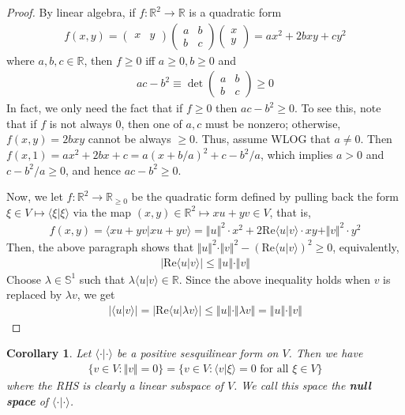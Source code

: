 \documentclass[12pt,b5paper,notitlepage]{article}
\theoremstyle{definition}
\theoremstyle{plain}
\newtheorem{co}[df]{Corollary}
\newcommand{\bk}[1]{\langle {#1}\rangle}
\newcommand{\Rbb}{\mathbb R}
\newcommand{\Sbb}{{\mathbb S}}
\newcommand{\Real}{\mathrm{Re}}
\numberwithin{equation}{section}
\begin{document}
\begin{proof}
By linear algebra, if $f:\Rbb^2\rightarrow\Rbb$ is a quadratic form
\begin{align*}
f(x,y)=\begin{pmatrix}
x&y
\end{pmatrix}\begin{pmatrix}
a&b\\
b&c
\end{pmatrix}
\begin{pmatrix}
x\\
y
\end{pmatrix}
=ax^2+2bxy+cy^2
\end{align*}
where $a,b,c\in\Rbb$, then $f\geq0$ iff $a\geq0,b\geq0$ and
\begin{align*}
ac-b^2\equiv\det\begin{pmatrix}
a&b\\
b&c
\end{pmatrix}\geq0
\end{align*}
In fact, we only need the fact that if $f\geq0$ then $ac-b^2\geq0$. To see this, note that if $f$ is not always $0$, then one of $a,c$ must be nonzero; otherwise, $f(x,y)=2bxy$ cannot be always $\geq0$. Thus, assume WLOG that $a\neq0$. Then $f(x,1)=ax^2+2bx+c=a(x+b/a)^2+c-b^2/a$, which implies $a>0$ and $c-b^2/a\geq0$, and hence $ac-b^2\geq0$.

Now, we let $f:\Rbb^2\rightarrow\Rbb_{\geq0}$ be the quadratic form defined by pulling back the form $\xi\in V\mapsto\bk{\xi|\xi}$ via the map $(x,y)\in\Rbb^2\mapsto xu+yv\in V$, that is,
\begin{align*}
f(x,y)=\bk{xu+yv|xu+yv}=\Vert u\Vert^2\cdot x^2+2\Real\bk{u|v}\cdot xy+\Vert v\Vert^2\cdot y^2
\end{align*}
Then, the above paragraph shows that $\Vert u\Vert^2\cdot\Vert v\Vert^2-(\Real\bk{u|v})^2\geq0$, equivalently,
\begin{align*}
|\Real\bk{u|v}|\leq \Vert u\Vert\cdot\Vert v\Vert
\end{align*}
Choose $\lambda\in\Sbb^1$ such that $\lambda\bk{u|v}\in\Rbb$. Since the above inequality holds when $v$ is replaced by $\lambda v$, we get
\begin{align*}
|\bk{u|v}|=|\Real\bk{u|\lambda v}|\leq\Vert u\Vert\cdot\Vert \lambda v\Vert=\Vert u\Vert\cdot\Vert v\Vert
\end{align*}
\end{proof}

\begin{co}\label{lb164}
Let $\bk{\cdot|\cdot}$ be a positive sesquilinear form on $V$. Then we have
\begin{align*}
\{v\in V:\Vert v\Vert=0\}=\{v\in V:\bk{v|\xi}=0\text{ for all }\xi\in V\}
\end{align*}
where the RHS is clearly a linear subspace of $V$. We call this space the \textbf{null space} of $\bk{\cdot|\cdot}$. 
\end{co}
\end{document}
